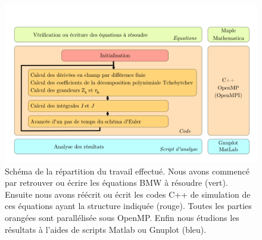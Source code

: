 \documentclass[10.5pt]{article}
\begin{document}
\begin{figure}[H]
	\begin{center}
		\includegraphics[width=0.95\columnwidth]{Diagramme_Code_2.pdf}
		\caption{Schéma de la répartition du travail effectué. Nous avons commencé par retrouver ou écrire les équations BMW à résoudre (vert). Ensuite nous avons réécrit ou écrit les codes C++ de simulation de ces équations ayant la structure indiquée (rouge). Toutes les parties orangées sont parallélisée sous OpenMP. Enfin nous étudions les résultats à l'aides de scripts Matlab ou Gnuplot (bleu).}
		\label{fig:org}
	\end{center}
\end{figure}
\end{document}

